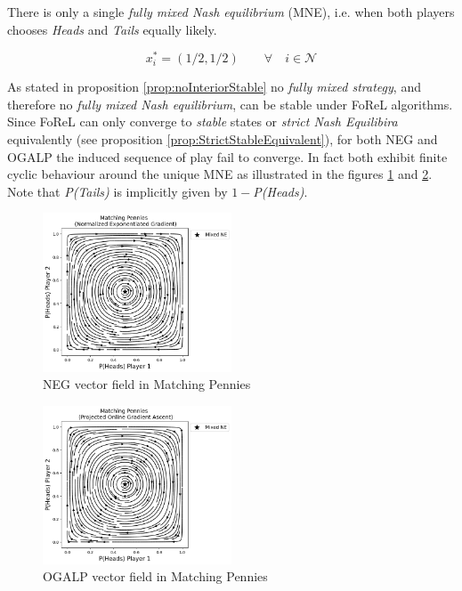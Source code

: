 There is only a single \textit{fully mixed Nash equilibrium} (MNE), i.e. when both players chooses \textit{Heads} and \textit{Tails} equally likely. 

\begin{equation*}
    x_{i}^{*} = (1/2,1/2) \qquad \forall \quad i \in \mathcal{N}
\end{equation*}

As stated in proposition \ref{prop:noInteriorStable} no \textit{fully mixed strategy}, and therefore no \textit{fully mixed Nash equilibrium}, can be stable under FoReL algorithms. Since FoReL can only converge to \textit{stable} states or \textit{strict Nash Equilibira} equivalently (see proposition \ref{prop:StrictStableEquivalent}), for both NEG and OGALP the induced sequence of play fail to converge. In fact both exhibit finite cyclic behaviour around the unique MNE as illustrated in the figures \ref{fig:Pennies1} and \ref{fig:Pennies2}. Note that \textit{P(Tails)} is implicitly given by $1 -$\textit{P(Heads)}. 

\begin{figure}[H]
    \centering
    \includegraphics[width=0.5\textwidth]{logos/Pennies1.png}
    \caption{NEG vector field in Matching Pennies}
    \label{fig:Pennies1}
\end{figure}

\begin{figure}[H]
    \centering
    \includegraphics[width=0.5\textwidth]{logos/Pennies2.png}
    \caption{OGALP vector field in Matching Pennies}
    \label{fig:Pennies2}
\end{figure}

